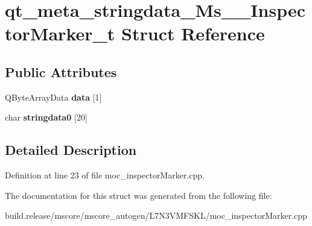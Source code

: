 \hypertarget{structqt__meta__stringdata___ms_____inspector_marker__t}{}\section{qt\+\_\+meta\+\_\+stringdata\+\_\+\+Ms\+\_\+\+\_\+\+Inspector\+Marker\+\_\+t Struct Reference}
\label{structqt__meta__stringdata___ms_____inspector_marker__t}
\subsection*{Public Attributes}
\begin{DoxyCompactItemize}
\item 
\mbox{\label{structqt__meta__stringdata___ms_____inspector_marker__t_a596b77eae1d399235fa23eb43685e71d}} 
Q\+Byte\+Array\+Data {\bfseries data} \mbox{[}1\mbox{]}
\item 
\mbox{\label{structqt__meta__stringdata___ms_____inspector_marker__t_a0c3629cde9983d29ebb2bba56eec655d}} 
char {\bfseries stringdata0} \mbox{[}20\mbox{]}
\end{DoxyCompactItemize}


\subsection{Detailed Description}


Definition at line 23 of file moc\+\_\+inspector\+Marker.\+cpp.



The documentation for this struct was generated from the following file\+:\begin{DoxyCompactItemize}
\item 
build.\+release/mscore/mscore\+\_\+autogen/\+L7\+N3\+V\+M\+F\+S\+K\+L/moc\+\_\+inspector\+Marker.\+cpp\end{DoxyCompactItemize}
